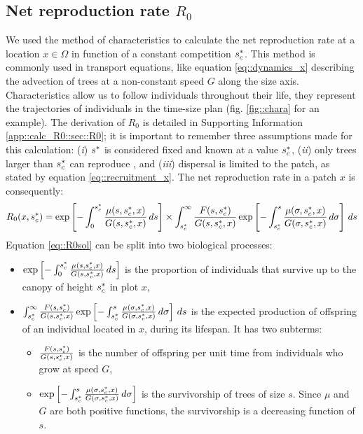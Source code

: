 \subsection{Net reproduction rate $ R_0 $}

We used the method of characteristics to calculate the net reproduction rate at
a location $ x \in \Omega $ in function of a constant competition $ {s}^{*}_c $. This method is commonly used in transport equations, like equation \eqref{eq::dynamics_x} describing the advection of trees at a non-constant speed $ G $ along the size axis. Characteristics allow us to follow individuals throughout their life, \ie they represent the trajectories of individuals in the time-size plan (fig. \ref{fig::chara} for an example).
The derivation of $ R_0 $ is detailed in Supporting Information
\ref{app::calc_R0::sec::R0}; it is important to remember three assumptions made for this
calculation: (\textit{i}) $ {s}^{*} $ is considered fixed and known at a value $ {s}^{*}_c
$, (\textit{ii}) only trees larger than $ {s}^{*}_c $ can reproduce
\citep{Strigul2008}, and (\textit{iii}) dispersal is limited to the patch, as
stated by equation \eqref{eq::recruitment_x}. The net reproduction rate in a
patch $ x $ is consequently:
\begin{equation} \label{eq::R0sol}
	R_0 (x, {s}^{*}_c) = \exp \left[-\int_0^{{s}^{*}_c}\frac{\mu(s, {s}^{*}_c, x)}{G(s, {s}^{*}_c, x)} \, ds \right] \times \int_{{s}^{*}_c}^{\infty} \frac{F(s, {s}^{*}_c)}{G(s, {s}^{*}_c, x)} \exp \left[-\int_{{s}^{*}_c}^{s} \frac{\mu(\sigma, {s}^{*}_c, x)}{G(\sigma, {s}^{*}_c, x)} \, d\sigma \right] \, ds
\end{equation}
Equation \eqref{eq::R0sol} can be split into two biological processes:
\begin{itemize}
	\item $ \exp\left[-\int_0^{{s}^{*}_c}\frac{\mu(s, {s}^{*}_c, x)}{G(s, {s}^{*}_c, x)} \, ds \right] $ is the proportion of individuals that survive up to the canopy of height $ {s}^{*}_c $ in plot $ x $,
	\item $ \int_{{s}^{*}_c}^{\infty} \frac{F(s, {s}^{*}_c)}{G(s, {s}^{*}_c, x)} \exp \left[-\int_{{s}^{*}_c}^{s} \frac{\mu(\sigma, {s}^{*}_c, x)}{G(\sigma, {s}^{*}_c, x)} \, d\sigma \right] \, ds $ is the expected production of offspring of an individual located in $ x $, during its lifespan. It has two subterms:
	\begin{itemize}[label=$ \circ $]
		\item $ \frac{F(s, {s}^{*}_c)}{G(s, {s}^{*}_c, x)} $ is the number of offspring per unit time from individuals who grow at speed $ G $,
		\item $ \exp \left[-\int_{{s}^{*}_c}^{s} \frac{\mu(\sigma, {s}^{*}_c, x)}{G(\sigma, {s}^{*}_c, x)} \, d\sigma \right] $ is the survivorship of trees of size $ s $. Since $ \mu $ and $ G $ are both positive functions, the survivorship is a decreasing function of $ s $.
	\end{itemize}
\end{itemize}

